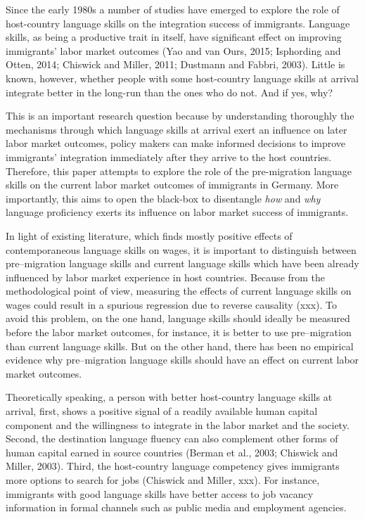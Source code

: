 \documentclass[12pt,a4paper]{article}
\begin{document}
Since the early 1980s a number of studies have emerged to explore the role of host-country language skills on the integration success of immigrants. Language skills, as being a productive trait in itself, have significant effect on improving immigrants' labor market outcomes (Yao and van Ours, 2015; Isphording and Otten, 2014; Chiswick and Miller, 2011; Dustmann and Fabbri, 2003). Little is known, however, whether people with some host-country language skills at arrival integrate better in the long-run than the ones who do not. And if yes, why? 

This is an important research question because by understanding thoroughly the mechanisms through which language skills at arrival exert an influence on later labor market outcomes, policy makers can make informed decisions to improve immigrants' integration immediately after they arrive to the host countries. Therefore, this paper attempts to explore the role of the pre-migration language skills on the current labor market outcomes of immigrants in Germany. More importantly, this aims to open the black-box to disentangle \textit{how} and \textit{why} language proficiency exerts its influence on labor market success of immigrants.

In light of existing literature, which finds mostly positive effects of contemporaneous language skills on wages, it is important to distinguish between pre--migration language skills and current language skills which have been already influenced by labor market experience in host countries. Because from the methodological point of view, measuring the effects of current language skills on wages could result in a spurious regression due to reverse causality (xxx). To avoid this problem, on the one hand, language skills should ideally be measured before the labor market outcomes, for instance, it is better to use pre--migration than current language skills. But on the other hand, there has been no empirical evidence why pre--migration language skills should have an effect on current labor market outcomes.

Theoretically speaking, a person with better host-country language skills at arrival, first, shows a positive signal of a readily available human capital component and the willingness to integrate in the labor market and the society. Second, the destination language fluency can also complement other forms of human capital earned in source countries (Berman et al., 2003; Chiswick and Miller, 2003). Third, the host-country language competency gives immigrants more options to search for jobs (Chiswick and Miller, xxx). For instance, immigrants with good language skills have better access to job vacancy information in formal channels such as public media and employment agencies. 
\end{document}
